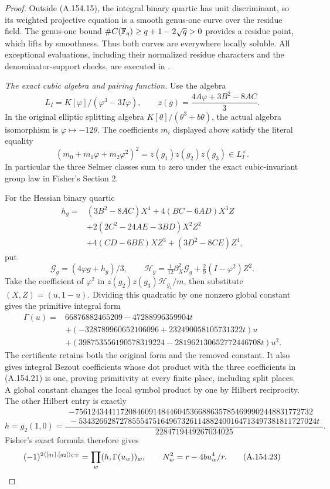 \begin{proof}
Outside (A.154.15), the integral binary quartic has unit
discriminant, so its weighted projective equation is a
smooth genus-one curve over the residue field.  The
genus-one bound \(\#C(\mathbb F_q)\geq q+1-2\sqrt q>0\)
provides a residue point, which lifts by smoothness.
Thus both curves are everywhere locally soluble.
All exceptional evaluations, including their normalized
residue characters and the denominator-support checks,
are executed in
.

\emph{The exact cubic algebra and pairing function.}
Use the algebra
\[
 L_I=K[\varphi]/(\varphi^3-3I\varphi),\qquad
 z(g)=\frac{4A\varphi+3B^2-8AC}{3}.
\tag{A.154.17}
\]
In the original elliptic splitting algebra
\(K[\theta]/(\theta^3+b\theta)\), the actual algebra
isomorphism is \(\varphi\mapsto-12\theta\).
The coefficients \(m_i\) displayed above satisfy the
literal equality
\[
       (m_0+m_1\varphi+m_2\varphi^2)^2
                         =z(g_1)z(g_2)z(g_3)\in L_I^\times.
\tag{A.154.18}
\]
In particular the three Selmer classes sum to zero under
the exact cubic-invariant group law in Fisher's Section 2.

For the Hessian binary quartic
\[
\begin{split}
h_g={}&(3B^2-8AC)X^4+4(BC-6AD)X^3Z\\
 &+2(2C^2-24AE-3BD)X^2Z^2\\
 &+4(CD-6BE)XZ^3+(3D^2-8CE)Z^4,
\end{split}
\tag{A.154.19}
\]
put
\[
 \mathcal G_g=(4\varphi g+h_g)/3,\qquad
 \mathcal H_g=\tfrac1{12}\partial_X^2\mathcal G_g
                         +\tfrac29(I-\varphi^2)Z^2.
\tag{A.154.20}
\]
Take the coefficient of \(\varphi^2\) in
\(z(g_2)z(g_3)\mathcal H_{g_1}/m\), then substitute
\((X,Z)=(u,1-u)\).  Dividing this quadratic by one
nonzero global constant gives the primitive integral form
\[
 \begin{split}
 \Gamma(u)={}&66876882465209-47288996359904t\\
 &+(-328789960652106096+232490058105731322t)u\\
 &+(398753556190578319224-281962130652772446708t)u^2.
 \end{split}
\tag{A.154.21}
\]
The certificate retains both the original form and the
removed constant.  It also gives integral Bezout coefficients
whose dot product with the three coefficients in
(A.154.21) is one, proving primitivity at every finite
place, including split places.  A global constant changes
the local symbol product by one by Hilbert reciprocity.
The other Hilbert entry is exactly
\[
 h=g_2(1,0)=
 \frac{\begin{gathered}\scriptstyle
 -7561243441172084609148446045366886357854699902448831772732\\[-2pt]
 \scriptstyle{}-5343266287278555475164967326114882400164713497381811727024t
 \end{gathered}}{2284719449267034025}.
\tag{A.154.22}
\]
Fisher's exact formula
\cite[Theorem 3.1 and Remark 3.2]{AgentFisherBinaryQuartics2022}
therefore gives
\[
       (-1)^{2\langle[g_1],[g_2]\rangle_{\rm CT}}
                 =\prod_w(h,\Gamma(u_w))_w,
       \qquad N_w^2=r-4bu_w^4/r.
\tag{A.154.23}
\]


\end{proof}
